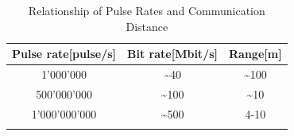 \begin{table}
\caption{Relationship of Pulse Rates and Communication Distance}
\label{tab:pulse_rate_range}
\centering
\begin{tabular}{c c c}
\toprule
\textbf{Pulse rate}[pulse/s] & \textbf{Bit rate}[Mbit/s] & \textbf{Range}[m]\\
\midrule
1'000'000 & \textasciitilde40 & \textasciitilde100\\
500'000'000 & \textasciitilde100 & \textasciitilde10\\
1'000'000'000 & \textasciitilde500 & 4-10\\
\bottomrule\\
\end{tabular}
\end{table}